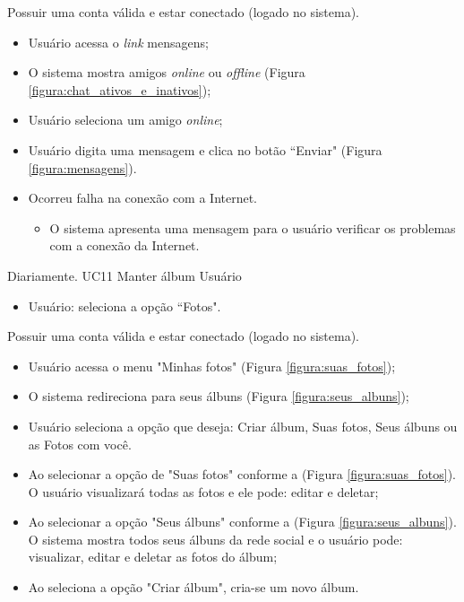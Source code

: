  {Possuir uma conta válida e estar conectado (logado no sistema).}
{}
{
\begin{itemize}
	\item Usuário acessa o \textit{link} mensagens;
	\item O sistema mostra amigos \textit{online} ou \textit{offline} (Figura \ref{figura:chat_ativos_e_inativos});
	\item Usuário seleciona um amigo \textit{online};
	\item Usuário digita uma mensagem e clica no botão ``Enviar" (Figura \ref{figura:mensagens}).
\end{itemize}
}
{
\begin{itemize}
	\item Ocorreu falha na conexão com a Internet.
	\begin{itemize}
	\item O sistema apresenta uma mensagem para o usuário verificar os problemas com a conexão da Internet.
	\end{itemize}
\end{itemize}
}
{Diariamente.}
{
}
\casoDeUso
{UC11}
{Manter álbum}
{Usuário}
{
\begin{itemize}
	\item Usuário: seleciona a opção ``Fotos".
	
\end{itemize}

}
 {Possuir uma conta válida e estar conectado (logado no sistema).}
{}
{
\begin{itemize}
	\item Usuário acessa o menu "Minhas fotos" (Figura \ref{figura:suas_fotos});
	\item O sistema redireciona para seus álbuns (Figura \ref{figura:seus_albuns});
	\item Usuário seleciona a opção que deseja: Criar álbum, Suas fotos, Seus álbuns ou as Fotos com você.
	
\end{itemize}
}
{
\begin{itemize}
	\item Ao selecionar a opção de "Suas fotos" conforme a (Figura \ref{figura:suas_fotos}). O usuário visualizará todas as fotos e ele pode: editar e deletar;
	\item Ao selecionar a opção "Seus álbuns" conforme a (Figura \ref{figura:seus_albuns}). O sistema mostra todos seus álbuns da rede social e o usuário pode: visualizar, editar e deletar as fotos do álbum;
	\item Ao seleciona a opção "Criar álbum", cria-se um novo álbum.
	
\end{itemize}
}
